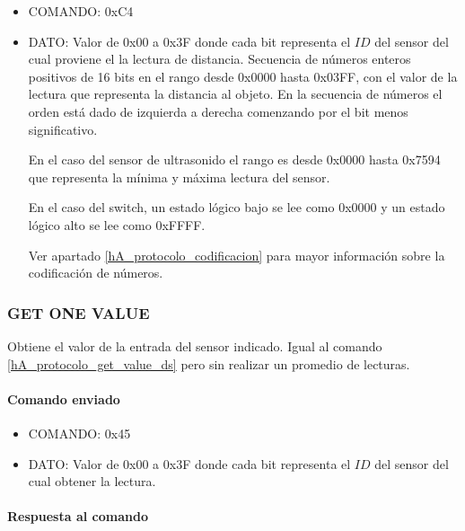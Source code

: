 \begin{itemize}
	\item{COMANDO:} 0xC4
	\item{DATO:} Valor de 0x00 a 0x3F donde cada bit representa el $ID$ del sensor del cual proviene el la lectura de distancia.
	Secuencia de n\'umeros enteros positivos de 16 bits en el rango desde 0x0000 hasta 0x03FF, con el valor de la lectura que representa la distancia al objeto.
	En la secuencia de n\'umeros el orden est\'a dado de izquierda a derecha comenzando por el bit menos significativo.

	En el caso del sensor de ultrasonido el rango es desde 0x0000 hasta 0x7594 que representa la m\'inima y m\'axima lectura del sensor.

	En el caso del switch, un estado l\'ogico bajo se lee como 0x0000 y un estado l\'ogico alto se lee como 0xFFFF.

	Ver apartado \ref{hA_protocolo_codificacion} para mayor informaci\'on sobre la codificaci\'on de n\'umeros.
\end{itemize}

\subsubsection{GET ONE VALUE}
\label{hA_protocolo_get_one_value_ds}

Obtiene el valor de la entrada del sensor indicado.
Igual al comando \ref{hA_protocolo_get_value_ds} pero sin realizar un promedio de lecturas.

\paragraph*{Comando enviado}

\begin{itemize}
	\item{COMANDO:} 0x45
	\item{DATO:} Valor de 0x00 a 0x3F donde cada bit representa el $ID$ del sensor del cual obtener la lectura.
\end{itemize}

\paragraph*{Respuesta al comando}


